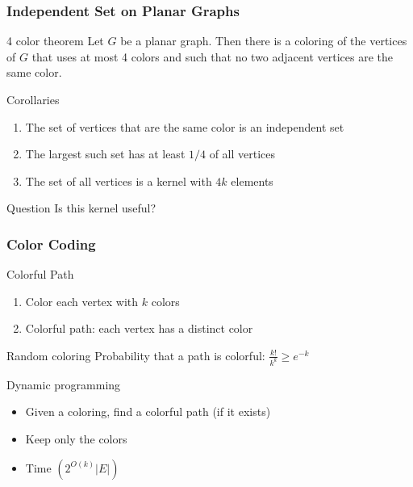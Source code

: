 \documentclass[12pt,aspectratio=169]{beamer}
\begin{document}
\begin{frame}\frametitle{Independent Set on Planar Graphs}
\begin{block}{4 color theorem}
Let $G$ be a planar graph.
Then there is a coloring of the vertices of $G$ that uses at most 4 colors and
such that no two adjacent vertices are the same color.
\end{block}

\begin{block}{Corollaries}
\begin{enumerate}
    \item
The set of vertices that are the same color is an independent set
\item
    The largest such set has at least $1/4$ of all vertices
\item
    The set of all vertices is a kernel with $4k$ elements
\end{enumerate}
\end{block}

\begin{block}{Question}
Is this kernel useful? 
\end{block}
\end{frame}

\begin{frame}\frametitle{Color Coding }
  \begin{block}{Colorful Path}
    \begin{enumerate}
    \item
      Color each vertex with $k$ colors
    \item
      Colorful path: each vertex has a distinct color
    \end{enumerate}
  \end{block}

  \begin{block}{Random coloring}
    Probability that a path is colorful: $\frac{k!}{k^{k}} \ge e^{-k}$
  \end{block}

  \begin{block}{Dynamic programming}
    \begin{itemize}
      \item
        Given a coloring, find a colorful path (if it exists)
      \item
        Keep only the colors
      \item
        Time $(2^{O(k)}|E|)$
      \end{itemize}
    \end{block}
\end{frame} 
\end{document}
